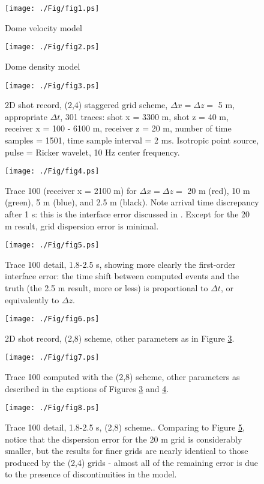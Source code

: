
\begin{figure}
\label{fig:vp2d_5m}
\texttt{[image: ./Fig/fig1.ps]}
\caption{Dome velocity model}
\end{figure}

\begin{figure}
\label{fig:dn2d_5m}
\texttt{[image: ./Fig/fig2.ps]}
\caption{Dome density model}
\end{figure}

\begin{figure}
\label{fig:data5m}
\texttt{[image: ./Fig/fig3.ps]}
\caption{2D shot record, (2,4) staggered grid scheme, $\Delta x = \Delta z =$ 5 m,
  appropriate $\Delta t$, 301 traces: shot x = 3300 m, shot z = 40 m, receiver x =
 100 - 6100 m, receiver z = 20 m, number of time samples = 1501, time
sample interval = 2 ms. Isotropic point source, pulse = Ricker wavelet, 10 Hz center frequency.}
\end{figure}

\begin{figure}
\label{fig:trace}
\texttt{[image: ./Fig/fig4.ps]}
\caption{Trace 100 (receiver x = 2100 m) for $\Delta x = \Delta z = $
  20 m (red), 10 m (green), 5 m (blue), and 2.5 m (black). Note
  arrival time discrepancy after 1 s: this is the interface error
  discussed in \cite{SymesVdovina:09}. Except for the 20 m result,
  grid dispersion error is minimal.} 
\end{figure}

\begin{figure}
\label{fig:wtrace}
\texttt{[image: ./Fig/fig5.ps]}
\caption{Trace 100 detail, 1.8-2.5 s, showing more clearly the
  first-order interface error: the time shift between computed events
  and the truth (the 2.5 m result, more or less) is proportional to
  $\Delta t$, or equivalently to $\Delta z$.}
\end{figure}

\begin{figure}
\label{data5m8k}
\texttt{[image: ./Fig/fig6.ps]}
\caption{2D shot record, (2,8) scheme, other
  parameters as in Figure \ref{fig:data5m}.}
\end{figure}

\begin{figure}
\label{fig:trace8k}
\texttt{[image: ./Fig/fig7.ps]}
\caption{Trace 100 computed with the (2,8) scheme,
  other parameters as described in the captions of Figures
  \ref{fig:data5m} and \ref{fig:trace}.} 
\end{figure}

\begin{figure}
\label{fig:wtrace8k}
\texttt{[image: ./Fig/fig8.ps]}
\caption{Trace 100 detail, 1.8-2.5 s, (2,8) scheme..
Comparing to Figure \ref{fig:wtrace}, notice that the dispersion error for
the 20 m grid is considerably smaller, but the results for finer grids
are nearly identical to those produced by the (2,4) grids - almost all
of the remaining error is due to the presence of discontinuities in
the model.}
\end{figure}